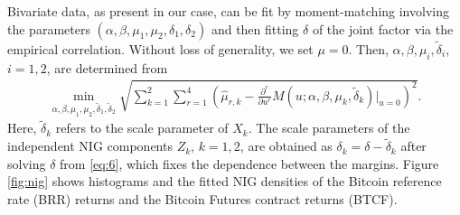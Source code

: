 Bivariate data, as present in our case, can be
fit by moment-matching involving the parameters $(\alpha, \beta,
\mu_1, \mu_2, \delta_1, \delta_2)$ and then fitting $\delta$ of the
joint factor via the empirical correlation. Without loss of
generality, we set $\mu=0$. Then, $\alpha, \beta,
\mu_i,\tilde\delta_i$, $i=1,2$, are determined from 
\begin{align*}
  \min_{\alpha, \beta, \mu_1, \mu_2, \tilde\delta_1, \tilde\delta_2}
  \sqrt{\sum_{k=1}^2 \sum_{r=1}^4
  \left(\hat\mu_{r,k}-\frac{\partial^r}{\partial u^r} M(u; \alpha, \beta,
  \mu_k, \tilde\delta_k)\Big|_{u=0}\right)^2}.
\end{align*}
Here, $\tilde\delta_k$ refers to the scale parameter of
$X_k$. The scale parameters of the independent NIG components $Z_k$,
$k=1,2$, are obtained as $\delta_k=\delta-\tilde \delta_k$ after
solving $\delta$ from \eqref{eq:6}, which fixes the dependence between
the margins. Figure \ref{fig:nig} shows
histograms and the fitted NIG densities of the Bitcoin reference rate
(BRR) returns and the Bitcoin Futures contract returns (BTCF). 


